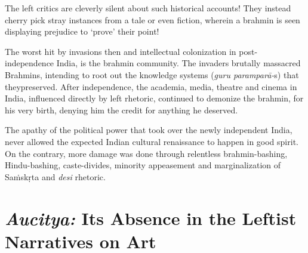 The left critics are cleverly silent about such historical accounts! They instead cherry pick stray instances from a tale or even fiction, wherein a brahmin is seen displaying prejudice to ‘prove’ their point!

The worst hit by invasions then and intellectual colonization in post-independence India, is the brahmin community. The invaders brutally massacred Brahmins, intending to root out the knowledge systems (\textit{guru paramparā-}s) that theypreserved. After independence, the academia, media, theatre and cinema in India, influenced directly by left rhetoric, continued to demonize the brahmin, for his very birth, denying him the credit for anything he deserved.

The apathy of the political power that took over the newly independent India, never allowed the expected Indian cultural renaissance to happen in good spirit. On the contrary, more damage was done through relentless brahmin-bashing, Hindu-bashing, caste-divides, minority appeasement and marginalization of Saṁskṛta and \textit{desi} rhetoric.

\vspace{-.4cm}

\section*{\textit{Aucitya:} Its Absence in the Leftist Narratives on Art}

